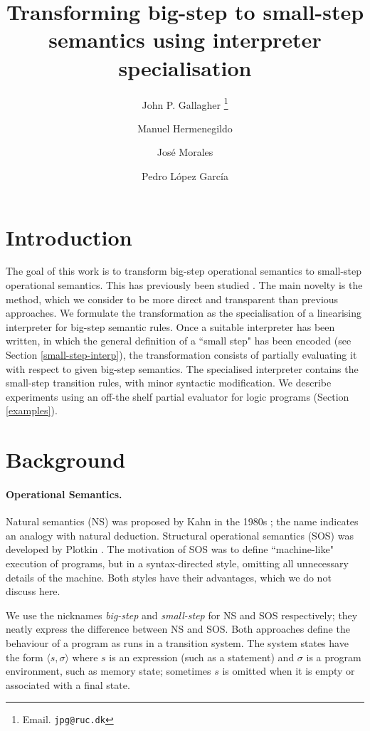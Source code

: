 \documentclass{llncs}
\title{Transforming big-step to small-step semantics using interpreter specialisation}
\author{John P. Gallagher \thanks{Email. \texttt{jpg@ruc.dk}}\inst{1}\inst{2}
\and
Manuel Hermenegildo\inst{2}  \and Jos\'e Morales
\inst{2} \and Pedro L\'opez Garc\'ia\inst{2} 
}
\institute{Roskilde University, Denmark
\and
IMDEA Software Institute, Madrid, Spain}
\begin{document}
\maketitle


\pagestyle{plain}

\linenumbers
\pagestyle{myheadings}

\section{Introduction}

The goal of this work is to transform big-step operational semantics to small-step operational semantics.
This has previously been studied \cite{VeselyF19,HuizingKK10,AmbalLSN22}.
The main novelty is the method, which we consider to be more
direct and transparent than previous approaches.  We formulate the transformation as the specialisation of a
linearising interpreter for big-step semantic rules.  Once a suitable interpreter has been written, in which the general
definition of a ``small step" has been encoded (see Section \ref{small-step-interp}), the transformation
consists of partially evaluating it with respect to given big-step semantics.  The specialised interpreter contains the 
small-step transition rules, 
with minor syntactic modification. We describe experiments using an off-the shelf partial evaluator 
for logic programs \cite{Logen} (Section \ref{examples}).
\section{Background}\label{background}

\paragraph{Operational Semantics.}
Natural semantics (NS) was proposed by Kahn in the 
1980s \cite{Kahn87}; the name indicates an analogy with natural deduction. 
Structural operational semantics (SOS) was developed by Plotkin \cite{Plotkin1981,Plotkin04,Plotkin04a}.  
The motivation of SOS was to define
``machine-like" execution of programs, but in a syntax-directed style, omitting all unnecessary details of
the machine.  Both styles have their advantages, which we do not discuss here.

We use the nicknames \emph{big-step} and \emph{small-step} for NS and SOS respectively;  they neatly
express the difference between NS and SOS.  Both approaches define the behaviour of a program
as runs in a transition system. The system states have the form $\langle s, \sigma\rangle$ where $s$ is an
expression (such as a statement) and $\sigma$ is a program environment, such as memory state; 
sometimes $s$ is omitted when it is empty
or associated with a final state.  
\end{document}
